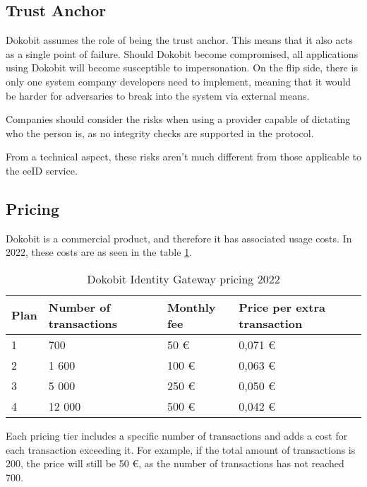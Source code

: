 \subsection{Trust Anchor}

Dokobit assumes the role of being the trust anchor. This means that it also acts as a single point of failure. Should Dokobit become compromised, all applications using Dokobit will become susceptible to impersonation. On the flip side, there is only one system company developers need to implement, meaning that it would be harder for adversaries to break into the system via external means.

Companies should consider the risks when using a provider capable of dictating who the person is, as no integrity checks are supported in the protocol.

From a technical aspect, these risks aren't much different from those applicable to the eeID service.

\subsection{Pricing}

Dokobit is a commercial product, and therefore it has associated usage costs. In 2022, these costs are as seen in the table \ref{tab:dokobit-pricing}.

\begin{table}[h]
  \centering
  \caption{Dokobit Identity Gateway pricing 2022}
  \begin{tabular}{| l | l | l | l |}
    \hline
    \bf{Plan} & \bf{Number of transactions} & \bf{Monthly fee} & \bf{Price per extra transaction} \\
    \hline
    1         & 700                         & 50 €             & 0,071 €                          \\
    \hline
    2         & 1 600                       & 100 €            & 0,063 €                          \\
    \hline
    3         & 5 000                       & 250 €            & 0,050 €                          \\
    \hline
    4         & 12 000                      & 500 €            & 0,042 €                          \\
    \hline
  \end{tabular}
  \label{tab:dokobit-pricing}
\end{table}

Each pricing tier includes a specific number of transactions and adds a cost for each transaction exceeding it. For example, if the total amount of transactions is 200, the price will still be 50 €, as the number of transactions has not reached 700.

